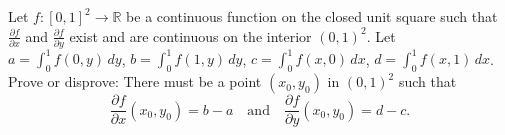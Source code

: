 Let $f:[0,1]^2 \to \mathbb{R}$ be a continuous function on the closed unit
square such that $\frac{\partial f}{\partial x}$ and $\frac{\partial f}{\partial y}$ exist
and are continuous on the interior $(0,1)^2$. Let $a = \int_0^1 f(0,y)\,dy$,
$b = \int_0^1 f(1,y)\,dy$, $c = \int_0^1 f(x,0)\,dx$, $d = \int_0^1 f(x,1)\,dx$.
Prove or disprove: There must be a point $(x_0,y_0)$ in $(0,1)^2$ such that
\[
\frac{\partial f}{\partial x} (x_0,y_0) = b - a
\quad \mbox{and} \quad
\frac{\partial f}{\partial y} (x_0,y_0) = d - c.
\]
